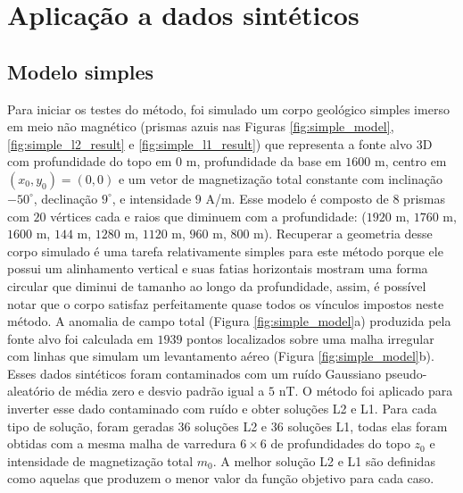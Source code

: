 \chapter{Aplicação a dados sintéticos}

\section{Modelo simples}

Para iniciar os testes do método, foi simulado um corpo geológico simples imerso em meio não magnético (prismas azuis nas Figuras 
\ref{fig:simple_model}, \ref{fig:simple_l2_result} e \ref{fig:simple_l1_result})
que representa a fonte alvo 3D com profundidade do topo em $0$ m, profundidade da base em $1600$ m, centro em $ (x_0, y_0) = (0, 0) $ e um vetor de magnetização total constante com inclinação $-50^{\circ}$, declinação $9^{\circ}$, e intensidade $9$ A/m.
Esse modelo é composto de $ 8 $ prismas com $ 20 $ vértices cada e raios que diminuem com a profundidade: ($ 1920 $ m, $ 1760 $ m, $ 1600 $ m, $ 144 $ m, $ 1280 $ m, $ 1120 $ m, $ 960 $ m, $ 800 $ m).
Recuperar a geometria desse corpo simulado é uma tarefa relativamente simples para este método porque ele possui um alinhamento vertical e suas fatias horizontais mostram uma forma circular que diminui de tamanho ao longo da profundidade, assim, é possível notar que o corpo satisfaz perfeitamente quase todos os vínculos impostos neste método.
A anomalia de campo total (Figura \ref{fig:simple_model}a) produzida pela fonte alvo foi calculada em $1939$ pontos localizados sobre uma malha irregular com linhas que simulam um levantamento aéreo (Figura \ref{fig:simple_model}b). Esses dados sintéticos foram contaminados com um ruído Gaussiano pseudo-aleatório de média zero e desvio padrão igual a $5$ nT.
O método foi aplicado para inverter esse dado contaminado com ruído e obter soluções L2 e L1.
Para cada tipo de solução, foram geradas $36$ soluções L2 e $36$ soluções L1, 
todas elas foram obtidas com a mesma malha de varredura $6 \times 6$ de profundidades do topo $z_{0}$ e intensidade de magnetização total $m_{0}$.
A melhor solução L2 e L1 são definidas como aquelas que produzem o menor valor da função objetivo para cada caso.

